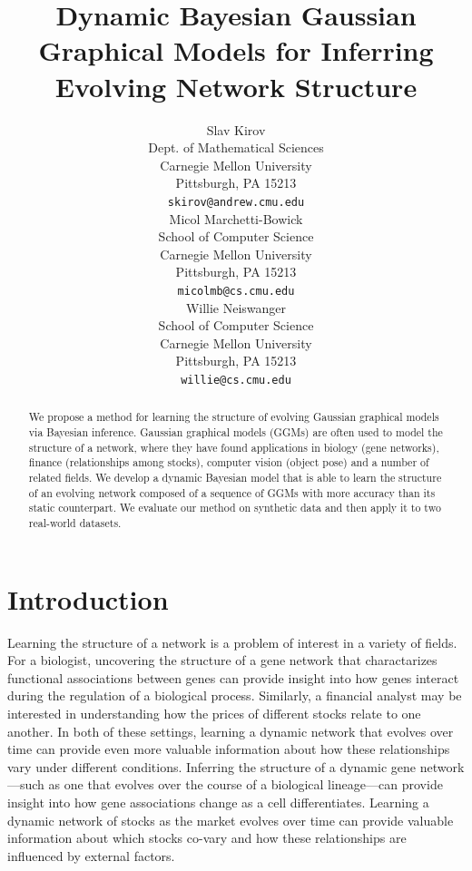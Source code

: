 \documentclass{article}
\title{Dynamic Bayesian Gaussian Graphical Models for Inferring Evolving Network Structure}
\author{ %
Slav Kirov\\
Dept. of Mathematical Sciences\\
Carnegie Mellon University\\
Pittsburgh, PA 15213 \\
\texttt{skirov@andrew.cmu.edu} \\
\And
Micol Marchetti-Bowick\\
School of Computer Science\\
Carnegie Mellon University\\
Pittsburgh, PA 15213 \\
\texttt{micolmb@cs.cmu.edu} \\
\And
Willie Neiswanger\\
School of Computer Science\\
Carnegie Mellon University\\
Pittsburgh, PA 15213 \\
\texttt{willie@cs.cmu.edu} \\
}
\begin{document}
\maketitle

\begin{abstract}
We propose a method for learning the structure of evolving Gaussian graphical models via Bayesian inference. Gaussian graphical models (GGMs) are often used to model the structure of a network, where they have found applications in biology (gene networks), finance (relationships among stocks), computer vision (object pose) and a number of related fields. We develop a dynamic Bayesian model that is able to learn the structure of an evolving network composed of a sequence of GGMs with more accuracy than its static counterpart.
We evaluate our method on synthetic data and then apply it to two real-world datasets.

\end{abstract}


\section{Introduction}
\label{sec:intro}

Learning the structure of a network is a problem of interest in a variety of fields. For a biologist, uncovering the structure of a gene network that charactarizes functional associations between genes can provide insight into how genes interact during the regulation of a biological process. 
Similarly, a financial analyst may be interested in understanding how the prices of different stocks relate to one another. 
In both of these settings, learning a dynamic network that evolves over time can provide even more valuable information about how these relationships vary under different conditions.
Inferring the structure of a dynamic gene network---such as one that evolves over the course of a biological lineage---can provide insight into how gene associations change as a cell differentiates. 
Learning a dynamic network of stocks as the market evolves over time can provide valuable information about which stocks co-vary and how these relationships are influenced by external factors.
\end{document}
